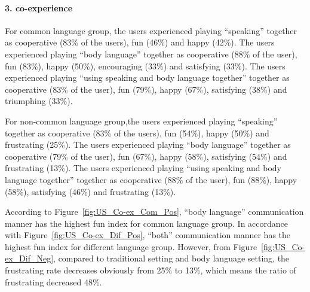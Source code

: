 


\paragraph{3. co-experience}

For common language group, the users experienced playing ``speaking'' together as cooperative (83\% of the users), fun (46\%) and happy (42\%). The users experienced playing ``body language'' together as cooperative (88\% of the user), fun (83\%), happy (50\%), encouraging (33\%) and satisfying (33\%). The users experienced playing ``using speaking and body language together'' together as cooperative (83\% of the user), fun (79\%), happy (67\%), satisfying (38\%) and triumphing (33\%).

For non-common language group,the users experienced playing ``speaking'' together as cooperative (83\% of the users), fun (54\%), happy (50\%) and frustrating (25\%). The users experienced playing ``body language'' together as cooperative (79\% of the user), fun (67\%), happy (58\%), satisfying (54\%) and frustrating (13\%). The users experienced playing ``using speaking and body language together'' together as cooperative (88\% of the user), fun (88\%), happy (58\%), satisfying (46\%) and frustrating (13\%). 


According to Figure~\ref{fig:US_Co-ex_Com_Pos}, ``body language'' communication manner has the highest fun index for common language group. In accordance with Figure~\ref{fig:US_Co-ex_Dif_Pos}, ``both'' communication manner has the highest fun index for different language group. However, from Figure~\ref{fig:US_Co-ex_Dif_Neg}, compared to traditional setting and body language setting, the frustrating rate decreases obviously from 25\% to 13\%, which means the ratio of frustrating decreased 48\%.


